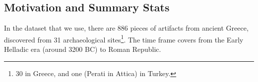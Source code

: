 \subsection{Motivation and Summary Stats}
In the dataset that we use, there are 886 pieces of artifacts from ancient
Greece, discovered from 31 archaeological sites\footnote{30 in Greece, and one
    (Perati in Attica) in Turkey.}. The time frame covers from the 
Early Helladic era (around 3200 BC) to Roman Republic. 
